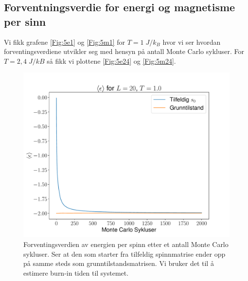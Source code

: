\documentclass[reprint,english,notitlepage]{revtex4-2}  %
\begin{document}
\subsection*{Forventningsverdie for energi og magnetisme per sinn}

Vi fikk grafene \autoref{Fig:5e1} og \autoref{Fig:5m1} for $T =  1 \; J/k_B $ hvor vi ser hvordan forventingsverdiene utvikler seg med hensyn på antall Monte Carlo sykluser. For $T = 2,4 \; J/kB$ så fikk vi plottene \autoref{Fig:5e24} og \autoref{Fig:5m24}. 

\begin{figure}[H]
\centering
\includegraphics[scale=0.4, trim=1.7cm 0 0 0 ]{../Images/meanepsT1L20.pdf}
\caption{Forventingsverdien av energien per spinn etter et antall Monte Carlo sykluser. Ser at den som starter fra tilfeldig spinnmatrise ender opp på samme steds som grunntilstandsmatrisen. Vi bruker det til å estimere burn-in tiden til systemet.}
\label{Fig:5e1}
\end{figure}
\end{document}
